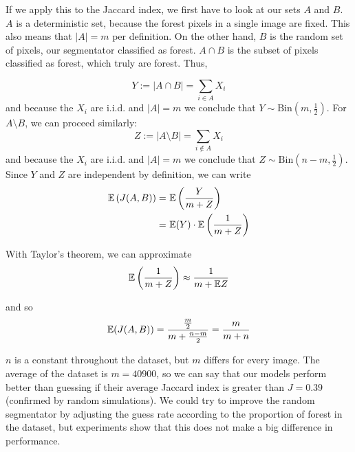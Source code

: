 If we apply this to the Jaccard index, we first have to look at our sets $A$ and $B$. $A$ is a deterministic set, because the forest pixels in a single image are fixed. This also means that $|A|=m$ per definition. On the other hand, $B$ is the random set of pixels, our segmentator classified as forest. $A \cap B$ is the subset of pixels classified as forest, which truly are forest. Thus,

\begin{equation}
  Y:= |A \cap B| = \sum_{i \in A} X_i
\end{equation}
and because the $X_i$ are i.i.d. and $|A|=m$ we conclude that $Y\sim \text{Bin}(m, \frac{1}{2})$. For $A\setminus B$, we can proceed similarly:
\begin{equation}
  Z:= |A\setminus B| = \sum_{i \notin A} X_i
\end{equation}
and because the $X_i$ are i.i.d. and $|A|=m$ we conclude that $Z\sim \text{Bin}\left (n-m, \frac{1}{2} \right)$. Since $Y$ and $Z$ are independent by definition, we can write
\begin{align*}
  \mathbb{E}\left(J(A,B)\right) = \ & \mathbb{E} \left(\frac{Y}{m+Z} \right) \\
   = \ & \mathbb{E}(Y) \cdot \mathbb{E} \left(\frac{1}{m+Z} \right)
\end{align*}

With Taylor's theorem, we can approximate
\begin{equation}
  \mathbb{E} \left(\frac{1}{m+Z}\right) \approx \frac{1}{m+\mathbb{E} Z}
\end{equation}

and so
\begin{equation}
  \mathbb{E}(J(A,B)) = \frac{\frac{m}{2}}{m + \frac{n-m}{2}} = \frac{m}{m+n}
\end{equation}

$n$ is a constant throughout the dataset, but $m$ differs for every image. The average of the dataset is $m=40900$, so we can say that our models perform better than guessing if their average Jaccard index is greater than $J = 0.39$ (confirmed by random simulations). We could try to improve the random segmentator by adjusting the guess rate according to the proportion of forest in the dataset, but experiments show that this does not make a big difference in performance.
